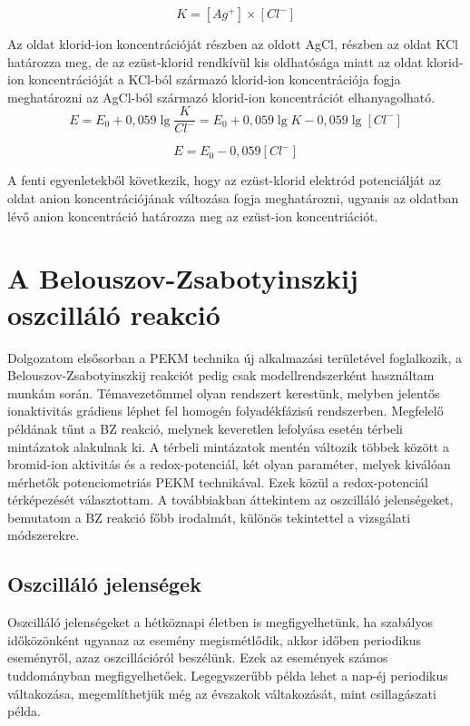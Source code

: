 \begin{enumerate}
\begin{equation}
K = [Ag^+] \times [Cl^-]
\end{equation}

Az oldat klorid-ion koncentrációját részben az oldott AgCl, részben az oldat KCl határozza meg, de az ezüst-klorid rendkívül kis oldhatósága miatt az oldat klorid-ion koncentrációját a KCl-ból származó klorid-ion koncentrációja fogja meghatározni az AgCl-ból származó klorid-ion koncentrációt elhanyagolható.\\

\begin{equation}
E = E_\text{0} + 0,059 \lg \frac{K}{Cl^-} = E_\text{0} + 0,059 \lg K - 0,059 \lg [Cl^-]
\end{equation}

\begin{equation}
E = E_\text{0} - 0,059 [Cl^-]
\end{equation}

A fenti egyenletekből következik, hogy az ezüst-klorid elektród potenciálját az oldat anion koncentrációjának változása fogja meghatározni, ugyanis az oldatban lévő anion koncentráció határozza meg az ezüst-ion koncentriációt.
\end{enumerate}
    


\section{A Belouszov-Zsabotyinszkij oszcilláló reakció}

Dolgozatom elsősorban a PEKM technika új alkalmazási területével foglalkozik, a Belouszov-Zsabotyinszkij reakciót pedig csak modellrendszerként használtam munkám során. Témavezetőmmel olyan rendszert kerestünk, melyben jelentős ionaktivitás grádiens léphet fel homogén folyadékfázisú rendszerben. Megfelelő példának tűnt a BZ reakció, melynek keveretlen lefolyása esetén térbeli mintázatok alakulnak ki. A térbeli mintázatok mentén változik többek között a bromid-ion aktivitás és a redox-potenciál, két olyan paraméter, melyek kiválóan mérhetők potenciometriás PEKM technikával. Ezek közül a redox-potenciál térképezését választottam. A továbbiakban áttekintem az oszcilláló jelenségeket, bemutatom a BZ reakció főbb irodalmát, különös tekintettel a vizsgálati módszerekre.

\subsection{Oszcilláló jelenségek}
Oszcilláló jelenségeket a hétköznapi életben is megfigyelhetünk, ha szabályos időközönként ugyanaz az esemény megismétlődik, akkor időben periodikus eseményről, azaz oszcillációról beszélünk. Ezek az események számos tuddományban megfigyelhetőek. Legegyszerűbb példa lehet a nap-éj periodikus váltakozása, megemlíthetjük még az évszakok váltakozását, mint csillagászati példa.

